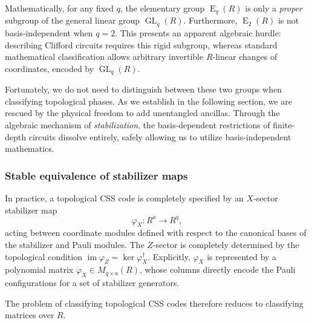 \documentclass[aps,prx,english,superscriptaddress,twocolumn,tightenlines,showpacs,longbibliography,floatfix,amsfonts]{revtex4-2}
\theoremstyle{remark}
\theoremstyle{definition}
\newcommand{\im}{\operatorname{im}}
\begin{document}
Mathematically, for any fixed $q$, the elementary group $\operatorname{E}_q(R)$ is only a \textit{proper} subgroup of the general linear group $\operatorname{GL}_q(R)$.
Furthermore, \(\operatorname{E}_2(R)\) is not basis-independent when \(q=2\). This presents an apparent algebraic hurdle: describing Clifford circuits requires this rigid subgroup, whereas standard mathematical classification allows arbitrary invertible \(R\)-linear changes of coordinates, encoded by $\operatorname{GL}_q(R)$.

Fortunately, we do not need to distinguish between these two groups when classifying topological phases. As we establish in the following section, we are rescued by the physical freedom to add unentangled ancillas. Through the algebraic mechanism of \textit{stabilization}, the basis-dependent restrictions of finite-depth circuits dissolve entirely, safely allowing us to utilize basis-independent mathematics.




\subsubsection{Stable equivalence of stabilizer maps}

In practice, a topological CSS code is completely specified by an $X$-sector stabilizer map
\begin{equation}
	\varphi_X \colon R^a \to R^q,
\end{equation}
acting between coordinate modules defined with respect to the canonical bases of the stabilizer and Pauli modules. The $Z$-sector is completely determined by the topological condition $\im \varphi_Z = \ker \varphi_X^\dagger$. Explicitly, $\varphi_X$ is represented by a polynomial matrix $\varphi_X \in M_{q \times a}(R)$, whose columns directly encode the Pauli configurations for a set of stabilizer generators.

The problem of classifying topological CSS codes therefore reduces to classifying matrices over $R$.
\end{document}
